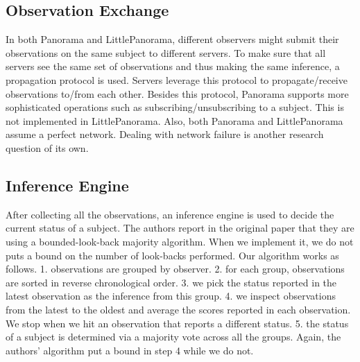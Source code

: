 \subsection{Observation Exchange}
In both Panorama and LittlePanorama, different observers might submit their observations on the same subject to different servers. To make sure that all servers see the same set of observations and thus making the same inference, a propagation protocol is used. Servers leverage this protocol to propagate/receive observations to/from each other. Besides this protocol, Panorama supports more sophisticated operations such as subscribing/unsubscribing to a subject. This is not implemented in LittlePanorama. Also, both Panorama and LittlePanorama assume a perfect network. Dealing with network failure is another research question of its own.

\subsection{Inference Engine}
\label{subsec:ie}
After collecting all the observations, an inference engine is used to decide the current status of a subject. The authors report in the original paper that they are using a bounded-look-back majority algorithm. When we implement it, we do not puts a bound on the number of look-backs performed. Our algorithm works as follows. 1. observations are grouped by observer. 2. for each group, observations are sorted in reverse chronological order. 3. we pick the status reported in the latest observation as the inference from this group. 4. we inspect observations from the latest to the oldest and average the scores reported in each observation. We stop when we hit an observation that reports a different status. 5. the status of a subject is determined via a majority vote across all the groups. Again, the authors' algorithm put a bound in step 4 while we do not.